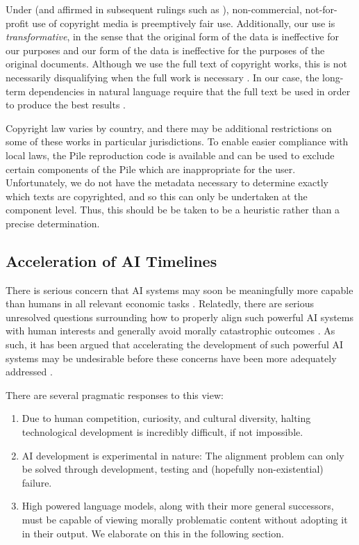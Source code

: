 Under \citet{presumptive-fair-use} (and affirmed in subsequent rulings such as \citet{affirm-presumption,guild-v-google}), non-commercial, not-for-profit use of copyright media is preemptively fair use. Additionally, our use is \textit{transformative}, in the sense that the original form of the data is ineffective for our purposes and our form of the data is ineffective for the purposes of the original documents. Although we use the full text of copyright works, this is not necessarily disqualifying when the full work is necessary \citep{full-work}. In our case, the long-term dependencies in natural language require that the full text be used in order to produce the best results \citep{transformer-xl,PG19,scaling-autoregressive,liu2018generating}.

Copyright law varies by country, and there may be additional restrictions on some of these works in particular jurisdictions. To enable easier compliance with local laws, the Pile reproduction code is available and can be used to exclude certain components of the Pile which are inappropriate for the user. Unfortunately, we do not have the metadata necessary to determine exactly which texts are copyrighted, and so this can only be undertaken at the component level. Thus, this should be be taken to be a heuristic rather than a precise determination.

\subsection{Acceleration of AI Timelines}

There is serious concern that AI systems may soon be meaningfully more capable than humans in all relevant economic tasks \citep{grace_when_2018,IEM}. Relatedly, there are serious unresolved questions surrounding how to properly align such powerful AI systems with human interests \citep{bostrom2014ethics,russell2019human,bostrom2014superintelligence,amodei_concrete_2016} and generally avoid morally catastrophic outcomes \citep{sotala_superintelligence_2017,monster}. As such, it has been argued that accelerating the development of such powerful AI systems may be undesirable before these concerns have been more adequately addressed \citep{bostrom2014superintelligence}. 

There are several pragmatic responses to this view:

\begin{enumerate}
\item Due to human competition, curiosity, and cultural diversity, halting technological development is incredibly difficult, if not impossible. \citep{russell2019human} \citep{critch2020ai}
\item AI development is experimental in nature: The alignment problem can only be solved through development, testing and (hopefully non-existential) failure.
\item High powered language models, along with their more general successors, must be capable of viewing morally problematic content without adopting it in their output. We elaborate on this in the following section.
\end{enumerate}

